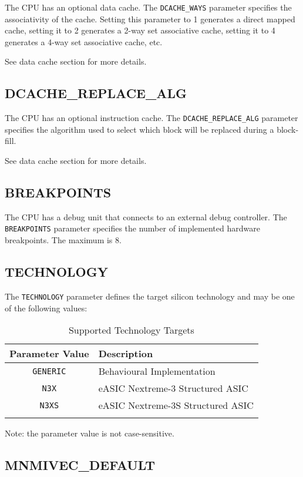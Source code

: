The CPU has an optional data cache. The \texttt{DCACHE\_WAYS} parameter specifies
the associativity of the cache. Setting this parameter to 1 generates a
direct mapped cache, setting it to 2 generates a 2-way set associative
cache, setting it to 4 generates a 4-way set associative cache, etc.

See data cache section for more details.

\subsection{DCACHE\_REPLACE\_ALG}\label{dcache_replace_alg}

The CPU has an optional instruction cache. The \texttt{DCACHE\_REPLACE\_ALG}
parameter specifies the algorithm used to select which block will be
replaced during a block-fill.

See data cache section for more details.

\subsection{BREAKPOINTS}\label{breakpoints}

The CPU has a debug unit that connects to an external debug controller.
The \texttt{BREAKPOINTS} parameter specifies the number of implemented hardware
breakpoints. The maximum is 8.

\subsection{TECHNOLOGY}\label{technology}

The \texttt{TECHNOLOGY} parameter defines the target silicon technology and may
be one of the following values:

\begin{longtable}[]{@{}cl@{}}
\toprule
Parameter Value & Description\tabularnewline
\midrule
\endhead
\texttt{GENERIC} & Behavioural Implementation\tabularnewline
\texttt{N3X} & eASIC Nextreme-3 Structured ASIC\tabularnewline
\texttt{N3XS} & eASIC Nextreme-3S Structured ASIC\tabularnewline
\bottomrule
\caption{Supported Technology Targets}
\label{tab:supported-tech-targets}

\end{longtable}

Note: the parameter value is not case-sensitive.

\subsection{MNMIVEC\_DEFAULT}\label{mnmivec_default}


